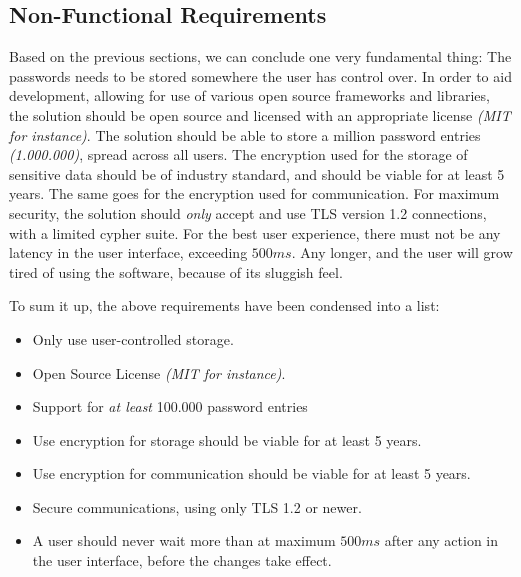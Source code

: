 		\subsection*{Non-Functional Requirements}
			Based on the previous sections, we can conclude one very fundamental thing: The passwords needs to be stored somewhere the user has control over. In order to aid development, allowing for use of various open source frameworks and libraries, the solution should be open source and licensed with an appropriate license \emph{(MIT for instance)}. The solution should be able to store a million password entries \emph{(1.000.000)}, spread across all users. The encryption used for the storage of sensitive data should be of industry standard, and should be viable for at least 5 years. The same goes for the encryption used for communication. For maximum security, the solution should \emph{only} accept and use TLS version 1.2 connections, with a limited cypher suite. For the best user experience, there must not be any latency in the user interface, exceeding $500ms$. Any longer, and the user will grow tired of using the software, because of its sluggish feel.

			To sum it up, the above requirements have been condensed into a list:
			\vspace{-3ex}\begin{itemize}
				\setlength\itemsep{0.1em}
				\item Only use user-controlled storage.
				\item Open Source License \emph{(MIT for instance)}.
				\item Support for \emph{at least} 100.000 password entries
				\item Use encryption for storage should be viable for at least 5 years.
				\item Use encryption for communication should be viable for at least 5 years.
				\item Secure communications, using only TLS 1.2 or newer.
				\item A user should never wait more than at maximum $500ms$ after any action in the user interface, before the changes take effect.
			\end{itemize}